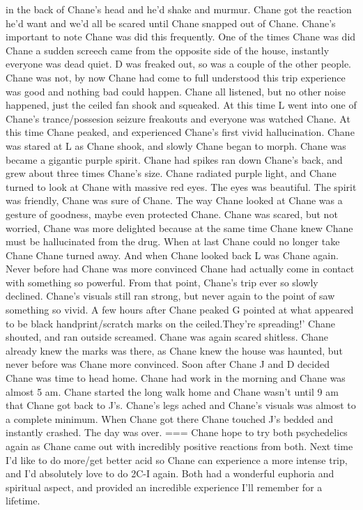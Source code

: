 \documentclass[12pt]{book}
\begin{document}
in the back of Chane's head and he'd shake and murmur. Chane got the reaction he'd want and we'd all be scared until Chane snapped out of Chane. Chane's important to note Chane was did this frequently. One of the times Chane was did Chane a sudden screech came from the opposite side of the house, instantly everyone was dead quiet. D was freaked out, so was a couple of the other people. Chane was not, by now Chane had come to full understood this trip experience was good and nothing bad could happen. Chane all listened, but no other noise happened, just the ceiled fan shook and squeaked. At this time L went into one of Chane's trance/possesion seizure freakouts and everyone was watched Chane. At this time Chane peaked, and experienced Chane's first vivid hallucination. Chane was stared at L as Chane shook, and slowly Chane began to morph. Chane was became a gigantic purple spirit. Chane had spikes ran down Chane's back, and grew about three times Chane's size. Chane radiated purple light, and Chane turned to look at Chane with massive red eyes. The eyes was beautiful. The spirit was friendly, Chane was sure of Chane. The way Chane looked at Chane was a gesture of goodness, maybe even protected Chane. Chane was scared, but not worried, Chane was more delighted because at the same time Chane knew Chane must be hallucinated from the drug. When at last Chane could no longer take Chane Chane turned away. And when Chane looked back L was Chane again. Never before had Chane was more convinced Chane had actually come in contact with something so powerful. From that point, Chane's trip ever so slowly declined. Chane's visuals still ran strong, but never again to the point of saw something so vivid. A few hours after Chane peaked G pointed at what appeared to be black handprint/scratch marks on the ceiled.They're spreading!' Chane shouted, and ran outside screamed. Chane was again scared shitless. Chane already knew the marks was there, as Chane knew the house was haunted, but never before was Chane more convinced. Soon after Chane J and D decided Chane was time to head home. Chane had work in the morning and Chane was almost 5 am. Chane started the long walk home and Chane wasn't until 9 am that Chane got back to J's. Chane's legs ached and Chane's visuals was almost to a complete minimum. When Chane got there Chane touched J's bedded and instantly crashed. The day was over. === Chane hope to try both psychedelics again as Chane came out with incredibly positive reactions from both. Next time I'd like to do more/get better acid so Chane can experience a more intense trip, and I'd absolutely love to do 2C-I again. Both had a wonderful euphoria and spiritual aspect, and provided an incredible experience I'll remember for a lifetime.
\end{document}
